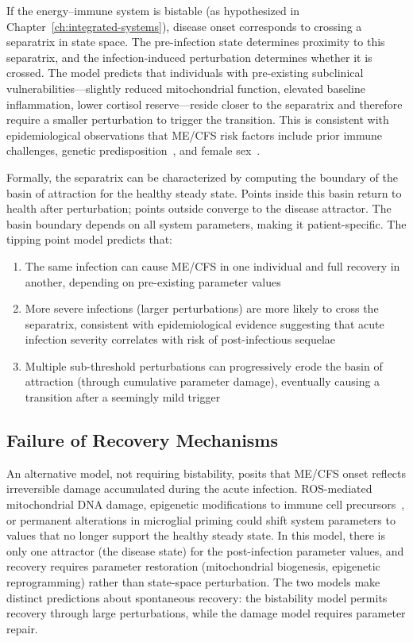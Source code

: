 If the energy--immune system is bistable (as hypothesized in Chapter~\ref{ch:integrated-systems}), disease onset corresponds to crossing a separatrix in state space. The pre-infection state determines proximity to this separatrix, and the infection-induced perturbation determines whether it is crossed. The model predicts that individuals with pre-existing subclinical vulnerabilities---slightly reduced mitochondrial function, elevated baseline inflammation, lower cortisol reserve---reside closer to the separatrix and therefore require a smaller perturbation to trigger the transition. This is consistent with epidemiological observations that ME/CFS risk factors include prior immune challenges, genetic predisposition~\cite{DecodeME2025}, and female sex~\cite{lim2020prevalence}.

Formally, the separatrix can be characterized by computing the boundary of the basin of attraction for the healthy steady state. Points inside this basin return to health after perturbation; points outside converge to the disease attractor. The basin boundary depends on all system parameters, making it patient-specific. The tipping point model predicts that:

\begin{enumerate}
    \item The same infection can cause ME/CFS in one individual and full recovery in another, depending on pre-existing parameter values
    \item More severe infections (larger perturbations) are more likely to cross the separatrix, consistent with epidemiological evidence suggesting that acute infection severity correlates with risk of post-infectious sequelae
    \item Multiple sub-threshold perturbations can progressively erode the basin of attraction (through cumulative parameter damage), eventually causing a transition after a seemingly mild trigger
\end{enumerate}

\subsection{Failure of Recovery Mechanisms}
\label{sec:recovery-failure}

An alternative model, not requiring bistability, posits that ME/CFS onset reflects irreversible damage accumulated during the acute infection. ROS-mediated mitochondrial DNA damage, epigenetic modifications to immune cell precursors~\cite{deVega2021dna_methylation}, or permanent alterations in microglial priming could shift system parameters to values that no longer support the healthy steady state. In this model, there is only one attractor (the disease state) for the post-infection parameter values, and recovery requires parameter restoration (mitochondrial biogenesis, epigenetic reprogramming) rather than state-space perturbation. The two models make distinct predictions about spontaneous recovery: the bistability model permits recovery through large perturbations, while the damage model requires parameter repair.

